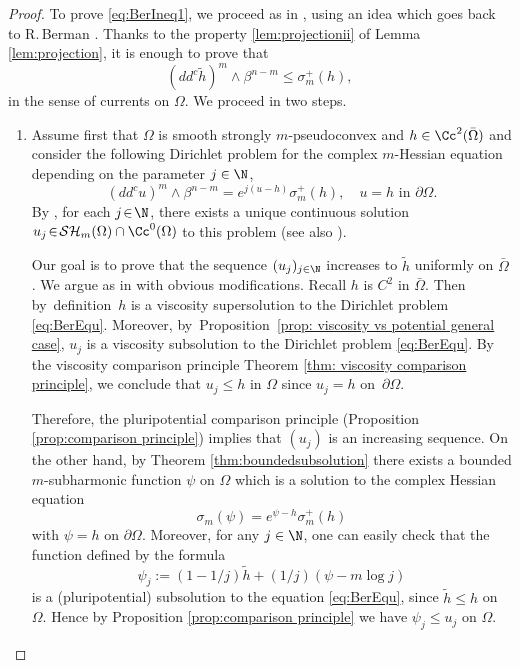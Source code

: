 \begin{proof} To prove \eqref{eq:BerIneq1}, we proceed as in \cite{GLZ19}, using an idea which goes back to R.\,Berman \cite{Ber19}. Thanks to the property \eqref{lem:projectionii} of Lemma \ref{lem:projection}, it is enough to prove that
\begin{equation} \label{eq:BerIneq2}
(dd^c \tilde h)^m \wedge \beta^{n - m} \leq \sigma_m^+ (h),
\end{equation}
in the sense of currents on $\Omega$. We proceed in two steps.

\begin{enumerate}
\item
Assume first that $\Omega$ is smooth strongly $m$-pseudoconvex and $h \in \Cc^2 (\bar \Omega)$ and consider the following Dirichlet problem for the complex $m$-Hessian equation depending on the parameter $j \in \N$,
\begin{equation} \label{eq:BerEqu}
(dd^c u)^m \wedge \beta^{n - m} = e^{j (u-h)} \sigma_m^+ (h), \quad u = h\text{ in }\partial \Omega.
\end{equation}
By \cite{Lu13}, for each $j\!\in\!\N$, there exists a unique continuous solution $u_j\!\in\!\mathcal {SH}_m (\Omega) \cap\Cc^0 (\Omega)$ to this problem (see also \cite{Ch16}).

Our goal is to prove that the sequence $(u_j)_{j\in \N}$ increases to $ \tilde h$ uniformly on $\bar{\Omega}$. We argue as in \cite{GLZ19} with obvious modifications. Recall $h$ is $C^2$ in $\bar{\Omega}$. Then by~definition~$h$ is a viscosity supersolution to the Dirichlet problem \eqref{eq:BerEqu}. Moreover, by~Proposition~\ref{prop: viscosity vs potential general case}, $u_j$ is a viscosity subsolution to the Dirichlet problem \eqref{eq:BerEqu}. By the viscosity comparison principle Theorem \ref{thm: viscosity comparison principle}, we conclude that $u_j \leq h$ in $ \Omega$ since $u_j = h$ on~$\partial \Omega$.

Therefore, the pluripotential comparison principle (Proposition \ref{prop:comparison principle}) implies that $(u_j)$ is an increasing sequence.
On the other hand, by Theorem \ref{thm:boundedsubsolution} there exists a bounded $m$-subharmonic function $\psi$ on $\Omega$ which is a solution to the complex Hessian equation
\[
\sigma_m (\psi) = e^{\psi - h} \sigma_m^+ (h)
\]
with $\psi = h$ on $\partial \Omega$.
Moreover, for any $j \in \N$, one can easily check that the function defined by the formula
\[
\psi_j:= (1- 1 \slash j) \tilde h + (1 \slash j) ( \psi - m \log j)
\]
is a (pluripotential) subsolution to the equation \eqref{eq:BerEqu}, since $ \tilde h \leq h$ on $\Omega$. Hence by Proposition \ref{prop:comparison principle} we have $\psi_j \leq u_j$ on $\Omega$.


\end{enumerate}
\end{proof}
